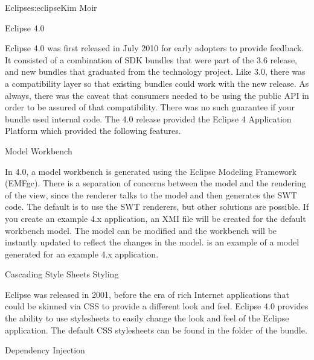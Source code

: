 \begin{aosachapter}{Eclipse}{s:eclipse}{Kim Moir}
\begin{aosasect1}{Eclipse 4.0}

Eclipse 4.0 was first released in July 2010 for early adopters to
provide feedback. It consisted of a combination of SDK bundles that
were part of the 3.6 release, and new bundles that graduated from the
technology project.  Like 3.0, there was a compatibility layer so that
existing bundles could work with the new release. As always, there was
the caveat that consumers needed to be using the public API in order
to be assured of that compatibility.  There was no such guarantee if
your bundle used internal code. The 4.0 release provided the Eclipse 4
Application Platform which provided the following features.

\begin{aosasect2}{Model Workbench}

In 4.0, a model workbench is generated using the Eclipse Modeling
Framework (EMFgc). There is a separation of concerns between the model
and the rendering of the view, since the renderer talks to the model
and then generates the SWT code. The default is to use the SWT
renderers, but other solutions are possible.  If you create an example
4.x application, an XMI file will be created for the default workbench
model. The model can be modified and the workbench will be instantly
updated to reflect the changes in the model. 
is an example of a model generated for an example 4.x application.


\end{aosasect2}

\begin{aosasect2}{Cascading Style Sheets Styling}

Eclipse was released in 2001, before the era of rich Internet
applications that could be skinned via CSS to provide a different look
and feel. Eclipse 4.0 provides the ability to use stylesheets to
easily change the look and feel of the Eclipse application. The
default CSS stylesheets can be found in the  folder of the
 bundle.

\end{aosasect2}

\begin{aosasect2}{Dependency Injection}


\end{aosasect2}
\end{aosasect1}
\end{aosachapter}
